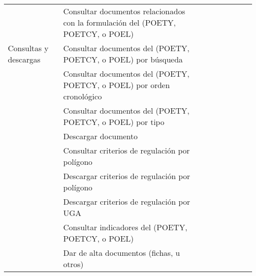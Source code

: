 \documentclass[a4paper]{report}
\begin{document}
\begin{longtable}{p{4cm} p{7cm} p{.5cm} p{.5cm} p{.5cm} p{0.8cm} p{0.8cm} p{0.8cm}p{0.8cm}}
& Consultar documentos relacionados con la formulación del (POETY, POETCY, o POEL) &\cellcolor{myotroazul} &\cellcolor{myotroazul} &\cellcolor{myotroazul} & \cellcolor{myamarillo}&\cellcolor{myamarillo}&\cellcolor{myamarillo}&\cellcolor{myamarillo} \\

Consultas y descargas & Consultar documentos del (POETY, POETCY, o POEL) por búsqueda & \cellcolor{myotroazul}&\cellcolor{myotroazul} &\cellcolor{myotroazul} &\cellcolor{myamarillo}&\cellcolor{myamarillo}&\cellcolor{myamarillo}&\cellcolor{myamarillo}\\

 & Consultar documentos del (POETY, POETCY, o POEL) por orden cronológico & \cellcolor{myotroazul}&\cellcolor{myotroazul} &\cellcolor{myotroazul} &\cellcolor{myamarillo}&\cellcolor{myamarillo}&\cellcolor{myamarillo}&\cellcolor{myamarillo}\\

 & Consultar documentos del (POETY, POETCY, o POEL) por tipo &\cellcolor{myotroazul} &\cellcolor{myotroazul} &\cellcolor{myotroazul} &\cellcolor{myamarillo}&\cellcolor{myamarillo}&\cellcolor{myamarillo}&\cellcolor{myamarillo}\\

 & Descargar documento &\cellcolor{myotroazul} &\cellcolor{myotroazul} &\cellcolor{myotroazul} &\cellcolor{myamarillo}&\cellcolor{myamarillo}&\cellcolor{myamarillo}&\cellcolor{myamarillo}\\

 & Consultar criterios de regulación por polígono &\cellcolor{myotroazul} &\cellcolor{myotroazul} &\cellcolor{myotroazul} &&&&\cellcolor{myamarillo}\\

 & Descargar criterios de regulación por polígono &\cellcolor{myotroazul} &\cellcolor{myotroazul} &\cellcolor{myotroazul} &&&&\cellcolor{myamarillo}\\

 & Descargar criterios de regulación por UGA & \cellcolor{myotroazul}&\cellcolor{myotroazul} &\cellcolor{myotroazul} &&&&\cellcolor{myamarillo}\\

 & Consultar indicadores del (POETY, POETCY, o POEL) &\cellcolor{myotroazul} &\cellcolor{myotroazul} & \cellcolor{myotroazul}  &&&&\cellcolor{myamarillo}\\
\hline

 & Dar de alta documentos (fichas, u otros) &\cellcolor{myotroazul}  & &\cellcolor{myotroazul} &\cellcolor{myamarillo}&\cellcolor{myamarillo}&\cellcolor{myamarillo}&\cellcolor{myamarillo}\\


\end{longtable}
\end{document}
